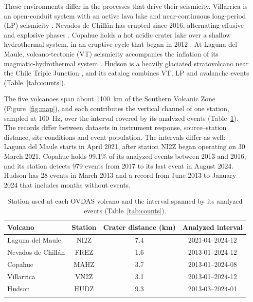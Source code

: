\documentclass[pdflatex,sn-mathphys-num]{sn-jnl}
\begin{document}
These environments differ in the processes that drive their seismicity.
Villarrica is an open-conduit system with an active lava lake and
near-continuous long-period (LP) seismicity \cite{richardson_varying_2014}.
Nevados de Chill\'an has erupted since 2016, alternating effusive and
explosive phases \cite{cardona_volcanic_2021}. Copahue holds a hot acidic
crater lake over a shallow hydrothermal system, in an eruptive cycle that
began in 2012 \cite{carbajal_seasonal_2025}. At Laguna del Maule,
volcano-tectonic (VT) seismicity accompanies the inflation of its
magmatic-hydrothermal system \cite{cardona_crustal_2018}. Hudson is a heavily
glaciated stratovolcano near the Chile Triple Junction
\cite{agurto-detzel_seismicity_2014}, and its catalog combines VT, LP and
avalanche events (Table~\ref{tab:counts}).

The five volcanoes span about 1100~km of the Southern Volcanic Zone
(Figure~\ref{fig:map}), and each contributes the vertical channel of one
station, sampled at 100~Hz, over the interval covered by its analyzed events
(Table~\ref{tab:stations}). The records differ between datasets in instrument
response, source--station distance, site conditions and event population. The intervals differ as well: Laguna del Maule starts in
April 2021, after station NI2Z began operating on
30 March 2021. Copahue holds 99.1\% of its analyzed events between 2013 and
2016, and its station detects 979 events from 2017 to its last event in
August 2024. Hudson has 28 events in March 2013 and a record from June 2013
to January 2024 that includes months without events.

\begin{table}[h]
\caption{Station used at each OVDAS volcano and the interval spanned by its
analyzed events (Table~\ref{tab:counts}).}\label{tab:stations}
\begin{tabular}{@{}lccc@{}}
\toprule
Volcano & Station & Crater distance (km) & Analyzed interval \\
\midrule
Laguna del Maule      & NI2Z & 7.4 & 2021-04--2024-12 \\
Nevados de Chill\'an  & FREZ & 1.6 & 2013-01--2024-12 \\
Copahue               & MAHZ & 3.7 & 2013-01--2024-08 \\
Villarrica            & VN2Z & 3.1 & 2013-01--2024-12 \\
Hudson                & HUDZ & 9.3 & 2013-03--2024-01 \\
\botrule
\end{tabular}
\end{table}
\end{document}
